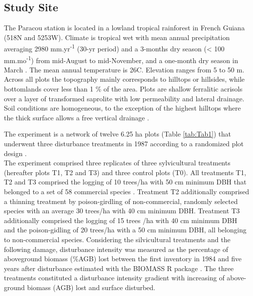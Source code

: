 \documentclass[fleqn,10pt]{ArtEcoFoG} %
\begin{document}
\subsection{Study Site}\label{study-site}

The Paracou station is located in a lowland tropical rainforest in
French Guiana (518\textdegree N and 5253\textdegree W). Climate is
tropical wet with mean annual precipitation averaging 2980
mm.yr\textsuperscript{-1} (30-yr period) and a 3-months dry season
(\textless{} 100 mm.mo\textsuperscript{-1}) from mid-August to
mid-November, and a one-month dry season in March \citep{Wagner2011}.
The mean annual temperature is 26\textdegree C. Elevation ranges from 5
to 50 m. Across all plots the topography mainly corresponds to hilltops
or hillsides, while bottomlands cover less than 1 \% of the area. Plots
are shallow ferralitic acrisols over a layer of transformed saprolite
with low permeability and lateral drainage. Soil conditions are
homogeneous, to the exception of the highest hilltops where the thick
surface allows a free vertical drainage \citep{Gourlet-Fleury2004}.

The experiment is a network of twelve 6.25 ha plots (Table
\ref{tab:Tab1}) that underwent three disturbance treatments in 1987
according to a randomized plot design \citep{Herault2018}.\\
The experiment comprised three replicates of three sylvicultural
treatments (hereafter plots T1, T2 and T3) and three control plots (T0).
All treatments T1, T2 and T3 comprised the logging of 10 trees/ha with
50 cm minimum DBH that belonged to a set of 58 commercial species
\citep{Gourlet-Fleury2004}. Treatment T2 additionally comprised a
thinning treatment by poison-girdling of non-commercial, randomly
selected species with an average 30 trees/ha with 40 cm minimum DBH.
Treatment T3 additionally comprised the logging of 15 trees /ha with 40
cm minimum DBH and the poison-gidling of 20 trees/ha with a 50 cm
minimum DBH, all belonging to non-commercial species. Considering the
silvicultural treatments and the following damage, disturbance intensity
was measured as the percentage of aboveground biomass (\%AGB) lost
between the first inventory in 1984 and five years after disturbance
\citep{Piponiot2016} estimated with the BIOMASS R package
\citep{Biomass2018}. The three treatments constituted a disturbance
intensity gradient with increasing of above-ground biomass (AGB) lost
and surface disturbed.
\end{document}

